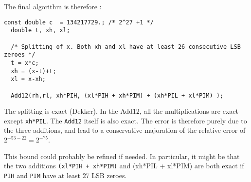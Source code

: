 The final algorithm is therefore :
\begin{lstlisting}[caption={Multiplication by $\pi$ \label{lst:trigpi:pix}},firstnumber=1]
  const double c  = 134217729.; /* 2^27 +1 */   
  double t, xh, xl;                           

  /* Splitting of x. Both xh and xl have at least 26 consecutive LSB zeroes */
  t = x*c;     
  xh = (x-t)+t;
  xl = x-xh;   

  Add12(rh,rl, xh*PIH, (xl*PIH + xh*PIM) + (xh*PIL + xl*PIM) );               
\end{lstlisting}

The splitting is exact (Dekker). In the Add12, all the multiplications
are exact except \texttt{xh*PIL}. The \texttt{Add12} itself is also
exact. The error is therefore purely due to the three additions, and
lead to a conservative majoration of the relative error of $2^{-53-22}
= 2^{-75}$. 

This bound could probably be refined if needed. In
particular, it might be that the two additions \texttt{(xl*PIH +
  xh*PIM)} and (xh*PIL + xl*PIM) are both exact if \texttt{PIH} and
\texttt{PIM} have at least 27 LSB zeroes.
